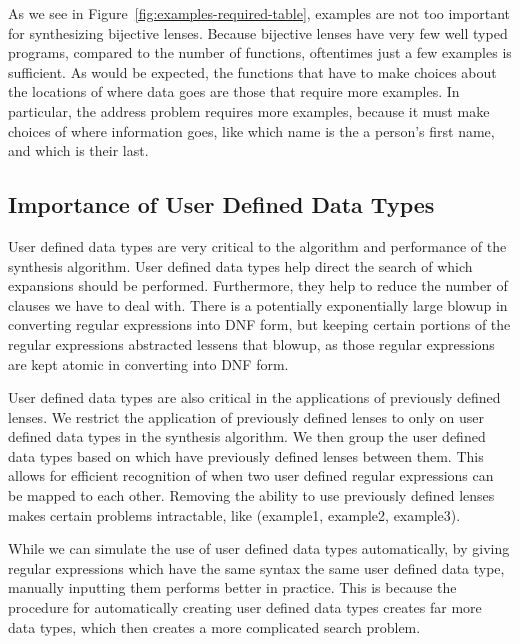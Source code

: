 \documentclass[numbers]{sigplanconf}
\begin{document}
As we see in Figure~\ref{fig:examples-required-table}, examples are not too
important for synthesizing bijective lenses.
Because bijective lenses have very few well typed programs, compared to the
number of functions, oftentimes just a few examples is sufficient.
As would be expected, the functions that have to make choices about the
locations of where data goes are those that require more examples.
In particular, the address problem requires more examples, because it must make
choices of where information goes, like which name is the a person's first name,
and which is their last.

\subsection{Importance of User Defined Data Types}

User defined data types are very critical to the algorithm and performance of
the synthesis algorithm.  User defined data types help direct the search of
which expansions should be performed.  Furthermore, they help to reduce the
number of clauses we have to deal with.  There is a potentially exponentially
large blowup in converting regular expressions into DNF form, but keeping
certain portions of the regular expressions abstracted lessens that blowup,
as those regular expressions are kept atomic in converting into DNF form.

User defined data types are also critical in the applications of previously
defined lenses.  We restrict the application of previously defined lenses to
only on user defined data types in the synthesis algorithm.  We then group the
user defined data types based on which have previously defined lenses between
them.  This allows for efficient recognition of when two user defined regular
expressions can be mapped to each other.  Removing the ability to use previously
defined lenses makes certain problems intractable, like (example1, example2,
example3).

While we can simulate the use of user defined data types automatically, by
giving regular expressions which have the same syntax the same user defined data
type, manually inputting them performs better in practice.  This is because the
procedure for automatically creating user defined data types creates far more
data types, which then creates a more complicated search problem.
\end{document}

